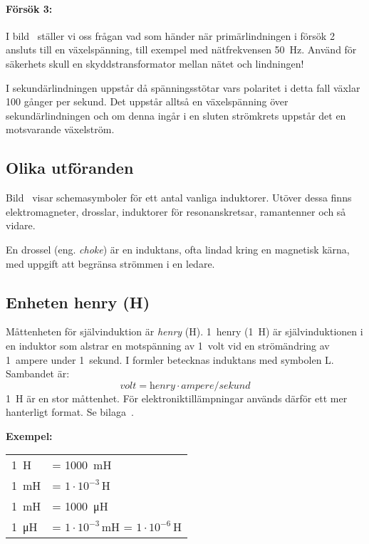 \paragraph{Försök 3:}
I bild~ ställer vi oss frågan vad som händer när
primärlindningen i försök 2 ansluts till en växelspänning, till exempel
med nätfrekvensen \qty{50}{\hertz}.
Använd för säkerhets skull en skyddstransformator mellan nätet och lindningen!

I sekundärlindningen uppstår då spänningsstötar vars polaritet i detta fall
växlar 100 gånger per sekund.
Det uppstår alltså en växelspänning över sekundärlindningen och om denna ingår i
en sluten strömkrets uppstår det en motsvarande växelström.


\subsection{Olika utföranden}

Bild~ visar schemasymboler för ett antal vanliga induktorer.
Utöver dessa finns elektromagneter, drosslar, induktorer för resonanskretsar,
ramantenner och så vidare.

En drossel (eng. \emph{choke}) är en induktans, ofta lindad kring en 
magnetisk 
kärna, med uppgift att begränsa strömmen i en ledare.

\subsection{Enheten henry (H)}
\label{enheten_henry}

Måttenheten för självinduktion är \emph{henry} (\unit{\henry}).
1~henry (\qty{1}{\henry}) är självinduktionen i en induktor som alstrar en
motspänning av 1~volt vid en strömändring av 1~ampere under 1~sekund.
I formler betecknas induktans med symbolen L.
Sambandet är:
\[\textit{volt} = \textit{henry} \cdot \textit{ampere}/\textit{sekund}\]
\qty{1}{\henry} är en stor måttenhet.
För elektroniktillämpningar används därför ett mer hanterligt format.
Se bilaga~.

\noindent\textbf{Exempel:}

\begin{center}
\begin{tabular}{ll}
\qty{1}{\henry} & = \qty{1000}{\milli\henry} \\
\qty{1}{\milli\henry} & = \(1 \cdot 10^{-3}\)\,H \\
\qty{1}{\milli\henry} & = \qty{1000}{\micro\henry} \\
\qty{1}{\micro\henry} & = \(1 \cdot 10^{-3}\)\,mH = \(1 \cdot 10^{-6}\)\,H
\end{tabular}
\end{center}

